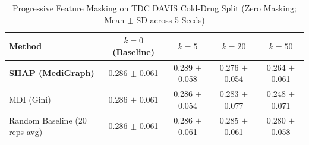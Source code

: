 \begin{table}[t]
\centering
\caption{Progressive Feature Masking on TDC DAVIS Cold-Drug Split (Zero Masking; Mean $\pm$ SD across 5 Seeds)}
\label{tab:shap_faithfulness}
\small
\begin{tabular}{lcccc}
\hline
\textbf{Method} & \textbf{$k=0$ (Baseline)} & \textbf{$k=5$} & \textbf{$k=20$} & \textbf{$k=50$} \\
\hline
\textbf{SHAP (MediGraph)} & 0.286 $\pm$ 0.061 & 0.289 $\pm$ 0.058 & 0.276 $\pm$ 0.054 & 0.264 $\pm$ 0.061 \\
MDI (Gini) & 0.286 $\pm$ 0.061 & 0.286 $\pm$ 0.054 & 0.283 $\pm$ 0.077 & 0.248 $\pm$ 0.071 \\
Random Baseline (20 reps avg) & 0.286 $\pm$ 0.061 & 0.286 $\pm$ 0.061 & 0.285 $\pm$ 0.061 & 0.280 $\pm$ 0.058 \\
\hline
\end{tabular}
\end{table}
